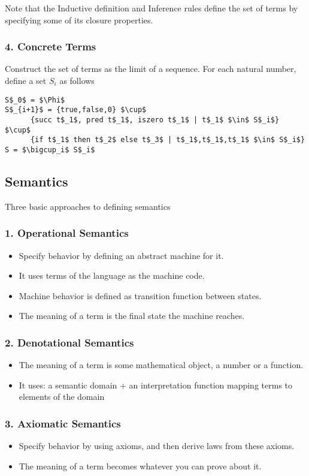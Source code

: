 \documentclass[fleqn]{article}
\begin{document}
Note that the Inductive definition and Inference rules define the set of terms by specifying some of its closure properties. 

\subsubsection*{4. Concrete Terms}
Construct the set of terms as the limit of a sequence. For each natural number, define a set $S_i$ as follows 
\begin{lstlisting}[mathescape=true]
S$_0$ = $\Phi$
S$_{i+1}$ = {true,false,0} $\cup$
      {succ t$_1$, pred t$_1$, iszero t$_1$ | t$_1$ $\in$ S$_i$} $\cup$
      {if t$_1$ then t$_2$ else t$_3$ | t$_1$,t$_1$,t$_1$ $\in$ S$_i$}
S = $\bigcup_i$ S$_i$
\end{lstlisting} 

\subsection*{Semantics}
Three basic approaches to defining semantics 
\subsubsection*{1. Operational Semantics}
\begin{itemize}
	\item Specify behavior by defining an abstract machine for it. 
	\item It uses terms of the language as the machine code.  
	\item Machine behavior is defined as transition function between states. 
	\item The meaning of a term is the final state the machine reaches. 
\end{itemize}

\subsubsection*{2. Denotational Semantics}
\begin{itemize}
	\item The meaning of a term is some mathematical object, a number or a function. 
	\item It uses: a semantic domain + an interpretation function mapping terms to elements of the domain 
\end{itemize}

\subsubsection*{3.	Axiomatic Semantics}
\begin{itemize}
	\item Specify behavior by using axioms, and then derive laws from these axioms. 
	\item The meaning of a term becomes whatever you can prove about it. 
\end{itemize}
\end{document}
